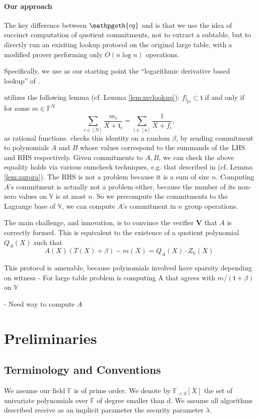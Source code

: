 \documentclass[11pt]{article} %
\newcommand{\cq}{\ensuremath{\mathpgoth{cq} }\xspace}
\newcommand{\F}{\ensuremath{\mathbb F}\xspace}
\newcommand{\ver}{\ensuremath{\mathsf{\mathbf{V}}}\xspace}
\newcommand{\polysofdeg}[1]{\ensuremath{\F_{< #1}[X]}\xspace}
\newcommand{\sumi}[1]{\sum_{i\in[#1]}}
\newcommand{\restricttoset}[2]{\ensuremath{#1|_{#2}}\xspace}
\newcommand{\subspace}{\ensuremath{\mathbb{H}}\xspace}
\newcommand{\bigspace}{\ensuremath{\mathbb{V}}\xspace}
\newcommand{\witsize}{\ensuremath{n}\xspace}
\newcommand{\witruntime}{\ensuremath{\witsize\log\witsize}\xspace}
\newcommand{\tabsize}{\ensuremath{N}\xspace}
\newcommand{\tab}{\ensuremath{\mathfrak{t}}\xspace}
\begin{document}
\paragraph{Our approach}
The key difference between \cq and \cite{caulk,caulkp,flookup,baloo} is that we use the idea of succinct computation
of quotient commitments, not to extract a subtable, but to directly run an exisiting lookup protocol on the original large table,  with a modified prover performing only $O(\witruntime)$ operations.


Specifically, we use as our starting point the ``logarithmic derivative based lookup'' of \cite{mvlookup}.

\cite{mvlookup} utilizes the following lemma (cf. Lemma \ref{lem:mvlookup}):
$\restricttoset{f}{\subspace}\subset \tab$ if and only if for some $m\in \F^\tabsize$
 \[\sumi{\tabsize}\frac{m_i}{X+\tab_i}=\sumi{\witsize}\frac{1}{X+f_i},\]
 as rational functions.
\cite{mvlookup} checks this identity on a random $\beta$,
by sending commitment to polynomials $A$ and $B$ whose values correspond to the summands of the LHS and RHS
respectively.
Given commitments to $A,B$, we can check the above equality holds via various sumcheck techniques, e.g. that described in \cite{aurora} (cf. Lemma \ref{lem:aurora}).
The RHS is not a problem because it is a sum of size \witsize.
Computing $A$'s commitment is actually not a problem either, because the number of its non-zero values on \bigspace
is at most \witsize. So we precompute the commitments to the Lagrange base of  \bigspace, we can compute $A$'s commitment in  \witsize group operations.

The main challenge, and innovation, is to convince the verifier \ver that $A$ is correctly formed.
This is equivalent to the existence of a quotient polynomial $Q_A(X)$ such that
\[A(X)(T(X)+\beta)-m(X)= Q_A(X)\cdot Z_\bigspace(X)\]


This protocol is amenable, because polynomials involved have sparsity depending on witness
- For large table problem is computing A that agrees with $m/(\tab+\beta)$ on \bigspace

- Need way to compute $A$ 
\section{Preliminaries}
\subsection{Terminology and Conventions}\label{sec:terminology}
We assume our field \F is of prime order.
We denote by \polysofdeg{d} the set of univariate polynomials over \F of degree smaller than d. 
We assume all algorithms described receive as an implicit parameter the security parameter $\lambda$.
\end{document}
